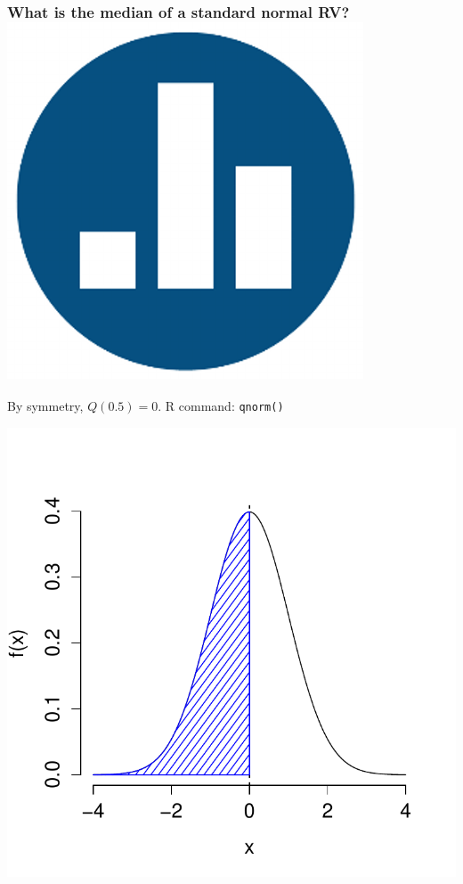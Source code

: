 \documentclass[handout]{beamer}
\begin{document}
\begin{frame}
\frametitle{What is the median of a standard normal RV?\hfill \includegraphics[scale = 0.05]{./images/clicker}}
\pause
By symmetry, $Q(0.5) = 0$. R command: \texttt{qnorm()}
\begin{center}
\includegraphics[scale = 0.6]{./images/normal_median}
\end{center}
\end{frame}
\end{document}

